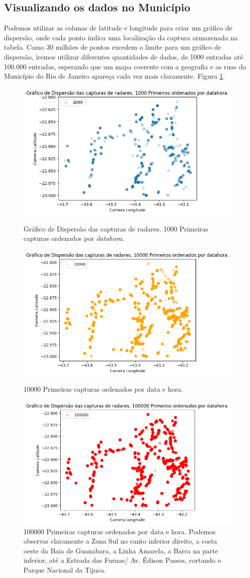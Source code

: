 \documentclass{article}
\begin{document}
\subsection{Visualizando os dados no Município}

Podemos utilizar as colunas de latitude e longitude para criar um gráfico de dispersão, onde cada ponto indica uma localização da captura armazenada na tabela. Como 30 milhões de pontos excedem o limite para um gráfico de dispersão, iremos utilizar diferentes quantidades de dados, de 1000 entradas até 100.000 entradas, esperando que um mapa coerente com a geografia e as ruas do Município do Rio de Janeiro apareça cada vez mais claramente. Figura \ref{fig:disp100k}.


\begin{figure}
\centering
\includegraphics[width=0.7\linewidth]{disp1000.png}
\caption{\label{fig:disp1k} Gráfico de Dispersão das capturas de radares. 1000 Primeiras capturas ordenados por \textit{datahora}.}
\includegraphics[width=0.7\linewidth]{disp10k.png}
\caption{\label{fig:disp10k} 10000 Primeiras capturas ordenados por data e hora.}
\includegraphics[width=0.8\linewidth]{disp100k.png}
\caption{\label{fig:disp100k} 100000 Primeiras capturas ordenados por data e hora. Podemos observar claramente a Zona Sul no canto inferior direito, a costa oeste da Baia de Guanabara, a Linha Amarela, a Barra na parte inferior, até a Estrada das Furnas/ Av. Édison Passos, cortando o Parque Nacional da Tijuca.}
\end{figure}
\end{document}
